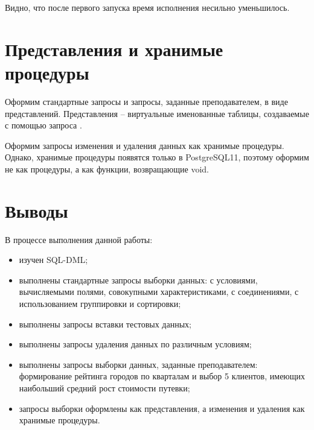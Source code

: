 Видно, что после первого запуска время исполнения несильно уменьшилось. 

\section{Представления и хранимые процедуры}

Оформим стандартные запросы и запросы, заданные преподавателем, в виде представлений. Представления -- виртуальные именованные таблицы, создаваемые с помощью запроса .



Оформим запросы изменения и удаления данных как хранимые процедуры. Однако, хранимые процедуры появятся только в PostgreSQL11, поэтому оформим не как процедуры, а как функции, возвращающие void.



\section{Выводы}

В процессе выполнения данной работы:
\begin{itemize}
	\item изучен SQL-DML;
	\item выполнены стандартные запросы выборки данных: с условиями, вычисляемыми полями, совокупными характеристиками, с соединениями, с использованием группировки и сортировки;
	\item выполнены запросы вставки тестовых данных;
	\item выполнены запросы удаления данных по различным условиям;
	\item выполнены запросы выборки данных, заданные преподавателем: формирование рейтинга городов по кварталам и выбор 5 клиентов, имеющих наибольший средний рост стоимости путевки;
	\item запросы выборки оформлены как представления, а изменения и удаления как хранимые процедуры.
\end{itemize}




